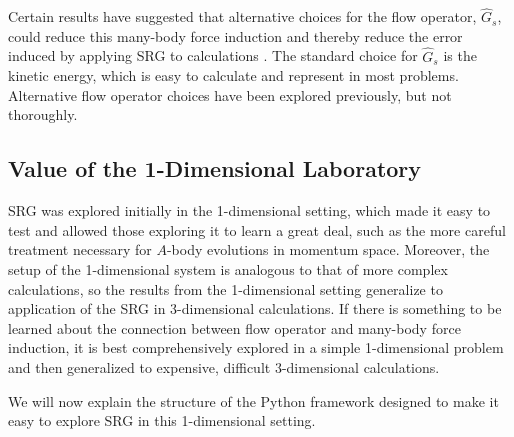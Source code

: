 Certain results have suggested that alternative choices for the flow operator, $\hat{G}_s$, could reduce this many-body force induction and thereby reduce the error induced by applying SRG to calculations \cite{Dicaire:2014fra}. The standard choice for $\hat{G}_s$ is the kinetic energy, which is easy to calculate and represent in most problems. Alternative flow operator choices have been explored previously, but not thoroughly.

\subsection{Value of the 1-Dimensional Laboratory}

SRG was explored initially in the 1-dimensional setting, which made it easy to test and allowed those exploring it to learn a great deal, such as the more careful treatment necessary for $A$-body evolutions in momentum space. Moreover, the setup of the 1-dimensional system is analogous to that of more complex calculations, so the results from the 1-dimensional setting generalize to application of the SRG in 3-dimensional calculations. If there is something to be learned about the connection between flow operator and many-body force induction, it is best comprehensively explored in a simple 1-dimensional problem and then generalized to expensive, difficult 3-dimensional calculations.

We will now explain the structure of the Python framework designed to make it easy to explore SRG in this 1-dimensional setting.